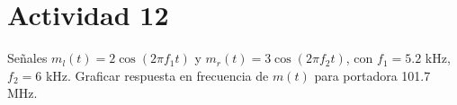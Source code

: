 \section{Actividad 12}

Señales $m_l(t)=2\cos(2\pi f_1 t)$ y $m_r(t)=3\cos(2\pi f_2 t)$, con $f_1=5.2$ kHz, $f_2=6$ kHz. Graficar respuesta en frecuencia de $m(t)$ para portadora 101.7 MHz.  
